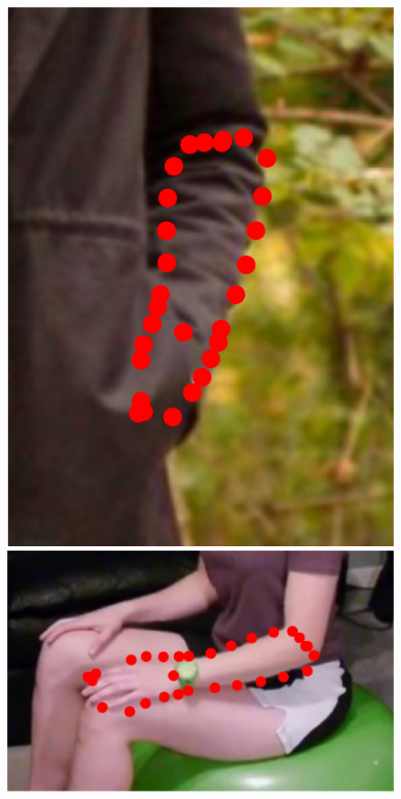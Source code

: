 \begin{figure}
    \newcommand{\ofh}{0.179\textwidth}
    \centering
    \includegraphics[height=\ofh]{resources/Annotation_Correction/Suplementory_Meterial/ExFit/0001.eps}
    \hfill
    \includegraphics[height=\ofh]{resources/Annotation_Correction/Suplementory_Meterial/ExFit/0002.eps}

\end{figure}
